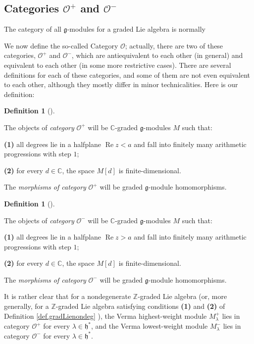 \documentclass
[numbers=enddot,12pt,final,onecolumn,german,notitlepage]{scrartcl}%
\theoremstyle{definition}
\newtheorem{defi}[theo]{Definition}
\newenvironment{definition}[1][]
{\begin{defi}[#1]\begin{leftbar}}
{\end{leftbar}\end{defi}}
\begin{document}
\subsection{Categories $\mathcal{O}^{+}$ and $\mathcal{O}^{-}$}

The category of all $\mathfrak{g}$-modules for a graded Lie algebra is normally

We now define the so-called Category $\mathcal{O}$; actually, there are two of
these categories, $\mathcal{O}^{+}$ and $\mathcal{O}^{-}$, which are
antiequivalent to each other (in general) and equivalent to each other (in
some more restrictive cases). There are several definitions for each of these
categories, and some of them are not even equivalent to each other, although
they mostly differ in minor technicalities. Here is our definition:

\begin{definition}
\label{def.O+}The objects of \textit{category }$\mathcal{O}^{+}$ will be
$\mathbb{C}$-graded $\mathfrak{g}$-modules $M$ such that:

\textbf{(1)} all degrees lie in a halfplane $\operatorname{Re}z<a$ and fall
into finitely many arithmetic progressions with step $1$;

\textbf{(2)} for every $d\in\mathbb{C}$, the space $M\left[  d\right]  $ is finite-dimensional.

The \textit{morphisms of category }$\mathcal{O}^{+}$ will be graded
$\mathfrak{g}$-module homomorphisms.
\end{definition}

\begin{definition}
\label{def.O-}The objects of \textit{category }$\mathcal{O}^{-}$ will be
$\mathbb{C}$-graded $\mathfrak{g}$-modules $M$ such that:

\textbf{(1)} all degrees lie in a halfplane $\operatorname{Re}z>a$ and fall
into finitely many arithmetic progressions with step $1$;

\textbf{(2)} for every $d\in\mathbb{C}$, the space $M\left[  d\right]  $ is finite-dimensional.

The \textit{morphisms of category }$\mathcal{O}^{-}$ will be graded
$\mathfrak{g}$-module homomorphisms.
\end{definition}

It is rather clear that for a nondegenerate $\mathbb{Z}$-graded Lie algebra
(or, more generally, for a $\mathbb{Z}$-graded Lie algebra satisfying
conditions \textbf{(1)} and \textbf{(2)} of Definition \ref{def.gradLienondeg}%
), the Verma highest-weight module $M_{\lambda}^{+}$ lies in category
$\mathcal{O}^{+}$ for every $\lambda\in\mathfrak{h}^{\ast}$, and the Verma
lowest-weight module $M_{\lambda}^{-}$ lies in category $\mathcal{O}^{-}$ for
every $\lambda\in\mathfrak{h}^{\ast}$.
\end{document}
